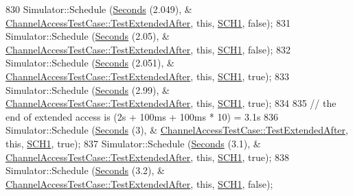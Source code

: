 \begin{DoxyCode}
830     Simulator::Schedule (\hyperlink{group__timecivil_ga33c34b816f8ff6628e33d5c8e9713b9e}{Seconds} (2.049), &
      \hyperlink{classChannelAccessTestCase_a9578cc501b608d9772c3ded4e6619c17}{ChannelAccessTestCase::TestExtendedAfter}, \textcolor{keyword}{this}, 
      \hyperlink{channel-manager_8h_a456a1b730523e5d3b8a29fb227d10028}{SCH1}, \textcolor{keyword}{false});
831     Simulator::Schedule (\hyperlink{group__timecivil_ga33c34b816f8ff6628e33d5c8e9713b9e}{Seconds} (2.05), &
      \hyperlink{classChannelAccessTestCase_a9578cc501b608d9772c3ded4e6619c17}{ChannelAccessTestCase::TestExtendedAfter}, \textcolor{keyword}{this}, 
      \hyperlink{channel-manager_8h_a456a1b730523e5d3b8a29fb227d10028}{SCH1}, \textcolor{keyword}{false});
832     Simulator::Schedule (\hyperlink{group__timecivil_ga33c34b816f8ff6628e33d5c8e9713b9e}{Seconds} (2.051), &
      \hyperlink{classChannelAccessTestCase_a9578cc501b608d9772c3ded4e6619c17}{ChannelAccessTestCase::TestExtendedAfter}, \textcolor{keyword}{this}, 
      \hyperlink{channel-manager_8h_a456a1b730523e5d3b8a29fb227d10028}{SCH1}, \textcolor{keyword}{true});
833     Simulator::Schedule (\hyperlink{group__timecivil_ga33c34b816f8ff6628e33d5c8e9713b9e}{Seconds} (2.99), &
      \hyperlink{classChannelAccessTestCase_a9578cc501b608d9772c3ded4e6619c17}{ChannelAccessTestCase::TestExtendedAfter}, \textcolor{keyword}{this}, 
      \hyperlink{channel-manager_8h_a456a1b730523e5d3b8a29fb227d10028}{SCH1}, \textcolor{keyword}{true});
834 
835     \textcolor{comment}{// the end of extended access is (2s +  100ms + 100ms * 10) = 3.1s}
836     Simulator::Schedule (\hyperlink{group__timecivil_ga33c34b816f8ff6628e33d5c8e9713b9e}{Seconds} (3), &
      \hyperlink{classChannelAccessTestCase_a9578cc501b608d9772c3ded4e6619c17}{ChannelAccessTestCase::TestExtendedAfter}, \textcolor{keyword}{this}, 
      \hyperlink{channel-manager_8h_a456a1b730523e5d3b8a29fb227d10028}{SCH1}, \textcolor{keyword}{true});
837     Simulator::Schedule (\hyperlink{group__timecivil_ga33c34b816f8ff6628e33d5c8e9713b9e}{Seconds} (3.1), &
      \hyperlink{classChannelAccessTestCase_a9578cc501b608d9772c3ded4e6619c17}{ChannelAccessTestCase::TestExtendedAfter}, \textcolor{keyword}{this}, 
      \hyperlink{channel-manager_8h_a456a1b730523e5d3b8a29fb227d10028}{SCH1}, \textcolor{keyword}{true});
838     Simulator::Schedule (\hyperlink{group__timecivil_ga33c34b816f8ff6628e33d5c8e9713b9e}{Seconds} (3.2), &
      \hyperlink{classChannelAccessTestCase_a9578cc501b608d9772c3ded4e6619c17}{ChannelAccessTestCase::TestExtendedAfter}, \textcolor{keyword}{this}, 
      \hyperlink{channel-manager_8h_a456a1b730523e5d3b8a29fb227d10028}{SCH1}, \textcolor{keyword}{false});

\end{DoxyCode}
